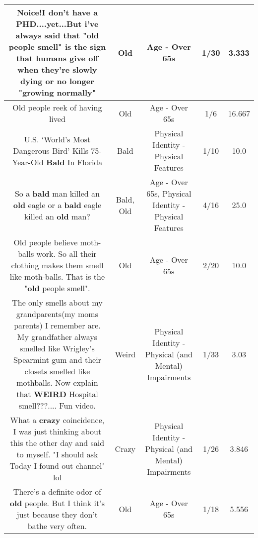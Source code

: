 \documentclass[11pt]{article}
\newlength\mylength
\begin{document}
\begin{center}
\begin{longtable}{|C{.65\mylength}|C{.30\mylength}|C{.12\mylength}|C{.12\mylength}|C{.12\mylength}|}
  \small Noice!I don't have a PHD....yet...But i've always said that "\textbf{old} people smell" is the sign that humans give off when they're slowly dying or no longer "growing normally"\normalsize   & Old & Age - Over 65s & 1/30 & 3.333 \\  \hline
  \small Old people reek of having lived\normalsize   & Old & Age - Over 65s & 1/6 & 16.667 \\  \hline
  \small U.S. ‘World's Most Dangerous Bird' Kills 75-Year-Old \textbf{Bald} In Florida\normalsize   & Bald & Physical Identity - Physical Features & 1/10 & 10.0 \\  \hline
  \small So a \textbf{bald} man killed an \textbf{old} eagle or a \textbf{bald} eagle killed an \textbf{old} man?\normalsize   & Bald, Old & Age - Over 65s, Physical Identity - Physical Features & 4/16 & 25.0 \\  \hline
  \small Old people believe moth-balls work. So all their clothing makes them smell like moth-balls.  That is the "\textbf{old} people smell".\normalsize   & Old & Age - Over 65s & 2/20 & 10.0 \\  \hline
  \small The only smells about my grandparents(my moms parents) I remember are. My grandfather always smelled like Wrigley's Spearmint gum and their closets smelled like mothballs. Now explain that \textbf{WEIRD} Hospital smell???.... Fun video.\normalsize   & Weird & Physical Identity - Physical (and Mental) Impairments & 1/33 & 3.03 \\  \hline
  \small What a \textbf{crazy} coincidence, I was just thinking about this the other day and said to myself. "I should ask Today I found out channel" lol\normalsize   & Crazy & Physical Identity - Physical (and Mental) Impairments & 1/26 & 3.846 \\  \hline
  \small There's a definite odor of \textbf{old} people.  But I think it's just because they don't bathe very often.\normalsize   & Old & Age - Over 65s & 1/18 & 5.556 \\  \hline

\end{longtable}
\end{center}
\end{document}
